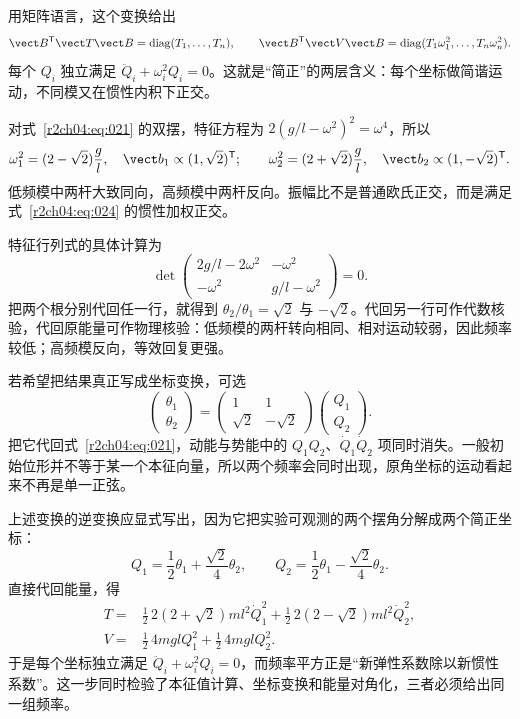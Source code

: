 用矩阵语言，这个变换给出
\[
 \vect B^{\mathsf T}\vect T\vect B
 =\operatorname{diag}(T_1,\ldots,T_n),\qquad
 \vect B^{\mathsf T}\vect V\vect B
 =\operatorname{diag}(T_1\omega_1^2,\ldots,T_n\omega_n^2).
\]
每个 $Q_i$ 独立满足 $\ddot Q_i+\omega_i^2Q_i=0$。这就是“简正”的两层含义：每个坐标做简谐运动，不同模又在惯性内积下正交。

对式~\eqref{r2ch04:eq:021} 的双摆，特征方程为 $2(g/l-\omega^2)^2=\omega^4$，所以
\begin{equation}
 \omega_1^2=(2-\sqrt2)\frac gl,\quad \vect b_1\propto(1,\sqrt2)^{\mathsf T};
 \qquad
 \omega_2^2=(2+\sqrt2)\frac gl,\quad \vect b_2\propto(1,-\sqrt2)^{\mathsf T}.
 \label{r2ch04:eq:025}
\end{equation}
低频模中两杆大致同向，高频模中两杆反向。振幅比不是普通欧氏正交，而是满足式~\eqref{r2ch04:eq:024} 的惯性加权正交。

特征行列式的具体计算为
\[
 \det\begin{pmatrix}
 2g/l-2\omega^2&-\omega^2\\
 -\omega^2&g/l-\omega^2
 \end{pmatrix}=0.
\]
把两个根分别代回任一行，就得到
$\theta_2/\theta_1=\sqrt2$ 与 $-\sqrt2$。代回另一行可作代数核验，代回原能量可作物理核验：低频模的两杆转向相同、相对运动较弱，因此频率较低；高频模反向，等效回复更强。

若希望把结果真正写成坐标变换，可选
\[
 \begin{pmatrix}\theta_1\\\theta_2\end{pmatrix}
 =
 \begin{pmatrix}1&1\\ \sqrt2&-\sqrt2\end{pmatrix}
 \begin{pmatrix}Q_1\\Q_2\end{pmatrix}.
\]
把它代回式~\eqref{r2ch04:eq:021}，动能与势能中的 $Q_1Q_2$、$\dot Q_1\dot Q_2$ 项同时消失。一般初始位形并不等于某一个本征向量，所以两个频率会同时出现，原角坐标的运动看起来不再是单一正弦。

上述变换的逆变换应显式写出，因为它把实验可观测的两个摆角分解成两个简正坐标：
\[
 Q_1=\frac12\theta_1+\frac{\sqrt2}{4}\theta_2,
 \qquad
 Q_2=\frac12\theta_1-\frac{\sqrt2}{4}\theta_2.
\]
直接代回能量，得
\[
 \begin{aligned}
 T={}&\frac12\,2(2+\sqrt2)ml^2\dot Q_1^2
      +\frac12\,2(2-\sqrt2)ml^2\dot Q_2^2,\\
 V={}&\frac12\,4mgl Q_1^2+
      \frac12\,4mgl Q_2^2.
 \end{aligned}
\]
于是每个坐标独立满足
$\ddot Q_i+\omega_i^2Q_i=0$，而频率平方正是“新弹性系数除以新惯性系数”。这一步同时检验了本征值计算、坐标变换和能量对角化，三者必须给出同一组频率。

